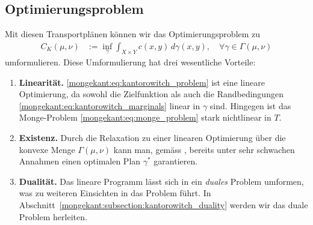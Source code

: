 \subsection{Optimierungsproblem}
Mit diesen Transportplänen können wir das Optimierungsproblem zu 
\begin{align}
C_K(\mu, \nu)
&:=
\inf_{\gamma}
\int_{X \times Y} c(x,y)\, d\gamma(x,y)
,\quad
\forall \gamma \in \Gamma(\mu, \nu)
\label{mongekant:eq:kantorowitch_problem}
\end{align}
umformulieren.
Diese Umformulierung hat drei wesentliche Vorteile:
\begin{enumerate}
\item \textbf{Linearität.}
\eqref{mongekant:eq:kantorowitch_problem}
ist eine lineare Optimierung,
da sowohl die Zielfunktion
als auch die Randbedingungen \eqref{mongekant:eq:kantorowitch_marginals}
linear in $\gamma$ sind.
Hingegen ist das Monge-Problem \eqref{mongekant:eq:monge_problem}
stark nichtlinear in $T$.
\item \textbf{Existenz.}
Durch die Relaxation zu einer linearen Optimierung
über die konvexe Menge $\Gamma(\mu,\nu)$ kann man,
gemäss \cite{mongekant:ethlecture},
bereits unter sehr schwachen Annahmen
einen optimalen Plan $\gamma^{\ast}$ garantieren.
\item \textbf{Dualität.}
Das lineare Programm lässt sich in ein \emph{duales} Problem umformen,
was zu weiteren Einsichten in das Problem führt.
In Abschnitt~\ref{mongekant:subsection:kantorowitch_duality} werden
wir das duale Problem herleiten.
\end{enumerate}

